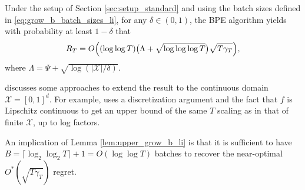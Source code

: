 \documentclass[10pt]{article}
\begin{document}
\begin{lemma}
    \emph{\citep[Theorem 1]{Li22}}
    \label{lem:upper_grow_b_li}
    Under the setup of Section \ref{sec:setup_standard} and using the batch sizes defined in \eqref{eq:grow_b_batch_sizes_li},
    for any $\delta \in (0,1)$,
    the BPE algorithm yields with probability at least $1-\delta$ that
    \begin{align*}
    	R_T=O \Bigl((\log\log T) \bigl(\Lambda + \sqrt{\log \log\log T}\bigr) \sqrt{T\gamma_T}\Bigr),
    \end{align*}
    where $\Lambda=\Psi+\sqrt{\log(|\mathcal{X}|/\delta)}$.
\end{lemma}
\begin{remark}
    \label{rmk:extent_to_continuous_domain}
    \citep{Li22} discusses some approaches \citep{Janz20, Vakili21a} to extend the result to the continuous domain $\mathcal{X}=[0,1]^d$. For example, \citep{Janz20} uses a discretization argument and the fact that $f$ is Lipschitz continuous \citep{Lee22} to get an upper bound of the same $T$ scaling as in that of finite $\mathcal{X}$, up to log factors.
\end{remark}

An implication of Lemma \ref{lem:upper_grow_b_li} is that it is sufficient to have $B = \lceil \log_2\log_2 T \rceil + 1 = O(\log\log T)$ batches to recover the near-optimal $O^*(\sqrt{T\gamma_T})$ regret.
\end{document}
